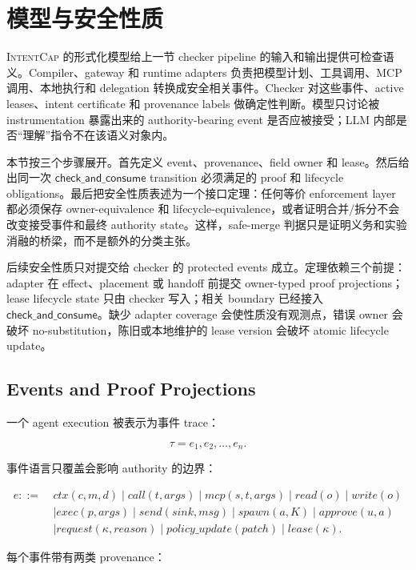 \documentclass[UTF8,a4paper,11pt]{ctexart}
\newcommand{\sys}{\textsc{IntentCap}\xspace}
\begin{document}
\section{模型与安全性质}
\label{sec:formal}

\sys 的形式化模型给上一节 checker pipeline 的输入和输出提供可检查语义。Compiler、gateway 和 runtime adapters 负责把模型计划、工具调用、MCP 调用、本地执行和 delegation 转换成安全相关事件。Checker 对这些事件、active leases、intent certificate 和 provenance labels 做确定性判断。模型只讨论被 instrumentation 暴露出来的 authority-bearing event 是否应被接受；LLM 内部是否“理解”指令不在该语义对象内。

本节按三个步骤展开。首先定义 event、provenance、field owner 和 lease。然后给出同一次 \(\mathsf{check\_and\_consume}\) transition 必须满足的 proof 和 lifecycle obligations。最后把安全性质表述为一个接口定理：任何等价 enforcement layer 都必须保存 owner-equivalence 和 lifecycle-equivalence，或者证明合并/拆分不会改变接受事件和最终 authority state。这样，safe-merge 判据只是证明义务和实验消融的桥梁，而不是额外的分类主张。

后续安全性质只对提交给 checker 的 protected events 成立。定理依赖三个前提：adapter 在 effect、placement 或 handoff 前提交 owner-typed proof projections；lease lifecycle state 只由 checker 写入；相关 boundary 已经接入 \(\mathsf{check\_and\_consume}\)。缺少 adapter coverage 会使性质没有观测点，错误 owner 会破坏 no-substitution，陈旧或本地维护的 lease version 会破坏 atomic lifecycle update。

\subsection{Events and Proof Projections}

一个 agent execution 被表示为事件 trace：

\[
\tau = e_1, e_2, \ldots, e_n .
\]

事件语言只覆盖会影响 authority 的边界：

\[
\begin{aligned}
e ::=~& ctx(c,m,d)
  \mid call(t,args)
  \mid mcp(s,t,args)
  \mid read(o)
  \mid write(o) \\
  & \mid exec(p,args)
  \mid send(sink,msg)
  \mid spawn(a,K)
  \mid approve(u,a) \\
  & \mid request(\kappa,reason)
  \mid policy\_update(patch)
  \mid lease(\kappa).
\end{aligned}
\]

每个事件带有两类 provenance：
\end{document}

